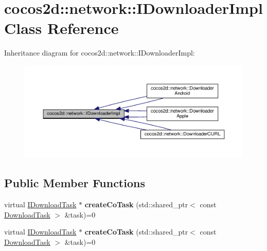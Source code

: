 \hypertarget{classcocos2d_1_1network_1_1IDownloaderImpl}{}\section{cocos2d\+:\+:network\+:\+:I\+Downloader\+Impl Class Reference}
\label{classcocos2d_1_1network_1_1IDownloaderImpl}


Inheritance diagram for cocos2d\+:\+:network\+:\+:I\+Downloader\+Impl\+:
\nopagebreak
\begin{figure}[H]
\begin{center}
\leavevmode
\includegraphics[width=350pt]{classcocos2d_1_1network_1_1IDownloaderImpl__inherit__graph}
\end{center}
\end{figure}
\subsection*{Public Member Functions}
\begin{DoxyCompactItemize}
\item 
\mbox{\label{classcocos2d_1_1network_1_1IDownloaderImpl_a7a008ad064fedd85dbd81f18c2396ce2}} 
virtual \hyperlink{classcocos2d_1_1network_1_1IDownloadTask}{I\+Download\+Task} $\ast$ {\bfseries create\+Co\+Task} (std\+::shared\+\_\+ptr$<$ const \hyperlink{classcocos2d_1_1network_1_1DownloadTask}{Download\+Task} $>$ \&task)=0
\item 
\mbox{\label{classcocos2d_1_1network_1_1IDownloaderImpl_a7a008ad064fedd85dbd81f18c2396ce2}} 
virtual \hyperlink{classcocos2d_1_1network_1_1IDownloadTask}{I\+Download\+Task} $\ast$ {\bfseries create\+Co\+Task} (std\+::shared\+\_\+ptr$<$ const \hyperlink{classcocos2d_1_1network_1_1DownloadTask}{Download\+Task} $>$ \&task)=0
\end{DoxyCompactItemize}
